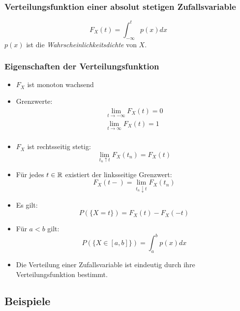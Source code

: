 \subsubsection{Verteilungsfunktion einer absolut stetigen Zufallsvariable}
\begin{equation*}
    F_X(t) = \int_{-\infty}^t p(x) dx
\end{equation*}
$p(x)$ ist die \emph{Wahrscheinlichkeitsdichte} von $X$.

\subsubsection{Eigenschaften der Verteilungsfunktion}
\begin{itemize}
    \item $F_X$ ist monoton wachsend
    \item Grenzwerte:
          \begin{align*}
              \lim_{t \to -\infty} F_X(t) = 0 \\
              \lim_{t \to \infty} F_X(t) = 1  \\
          \end{align*}
    \item $F_X$ ist rechtsseitig stetig:
          \begin{equation*}
              \lim_{t_n \uparrow t} F_X(t_n) = F_X(t)
          \end{equation*}
    \item Für jedes $t \in \mathbb{R}$ existiert der linksseitige Grenzwert:
          \begin{equation*}
              F_X(t-) = \lim_{t_n \downarrow t} F_X(t_n)
          \end{equation*}
    \item Es gilt:
          \begin{equation*}
              P(\{X=t\}) = F_X(t) - F_X(-t)
          \end{equation*}
    \item Für $a<b$ gilt:
          \begin{equation*}
              P(\{X \in [a,b]\}) = \int_a^b p(x)dx
          \end{equation*}
    \item Die Verteilung einer Zufallsvariable ist eindeutig durch ihre Verteilungsfunktion
          bestimmt.
\end{itemize}

\subsection{Beispiele}
